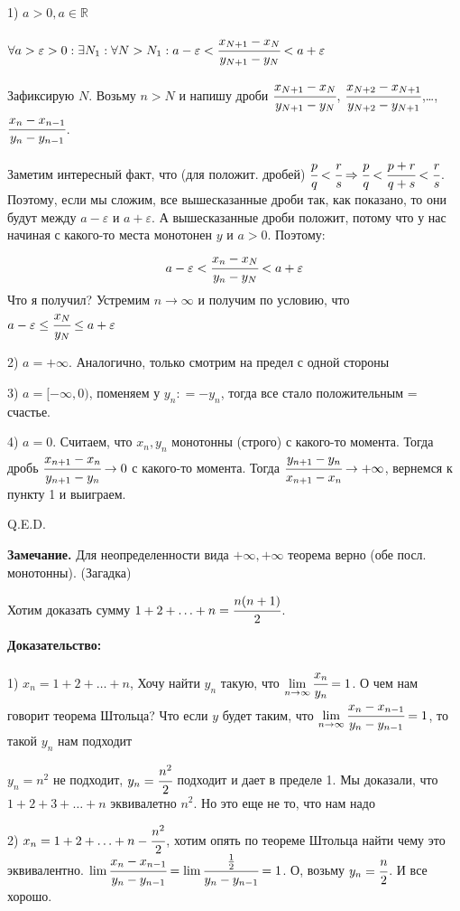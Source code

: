 1) $a>0, a \in \mathbb{R}$

$\forall a>\varepsilon>0:\exists N_1: \forall N>N_1: a-\varepsilon < \cfrac{x_{N+1}-x_N}{y_{N+1}-y_N} <a+\varepsilon$

Зафиксирую $N$. Возьму $n>N$ и напишу дроби $\cfrac{x_{N+1}-x_N}{y_{N+1}-y_N}$, $\cfrac{x_{N+2}-x_{N+1}}{y_{N+2}-y_{N+1}}$,\ldots, $\cfrac{x_{n}-x_{n-1}}{y_{n}-y_{n-1}}$.

Заметим интересный факт, что (для положит. дробей) $\cfrac{p}{q}<\cfrac{r}{s} \Rightarrow \cfrac{p}{q}<\cfrac{p+r}{q+s}<\cfrac{r}{s} $. Поэтому, если мы сложим, все вышесказанные дроби так, как показано, то они будут между $a-\varepsilon$ и $a+\varepsilon$. А вышесказанные дроби положит, потому что у нас начиная с какого-то места монотонен $y$ и $a>0$. Поэтому:
$$a-\varepsilon<\cfrac{x_n-x_N}{y_n-y_N}<a+\varepsilon$$
Что я получил? Устремим $n \rightarrow \infty$ и получим по условию, что $a-\varepsilon\leq\cfrac{x_N}{y_N}\leq a + \varepsilon$

2) $a = +\infty$. Аналогично, только смотрим на предел с одной стороны

3) $a = [-\infty, 0 )$, поменяем у $y_n: = -y_n$, тогда все стало положительным = счастье.

4) $a = 0$. Считаем, что $x_n, y_n$ монотонны (строго) с какого-то момента. Тогда дробь $\cfrac{x_{n+1}-x_n}{y_{n+1}-y_n} \rightarrow 0 $ с какого-то момента. Тогда  $\cfrac{y_{n+1}-y_n}{x_{n+1}-x_n} \rightarrow +\infty $, вернемся к пункту 1 и выиграем.

\hfill Q.E.D.

\textbf{Замечание.} Для неопределенности вида $+\infty,+\infty$ теорема верно (обе посл. монотонны). (Загадка)


Хотим доказать сумму $1 + 2 + \ldots + n = \cfrac{n(n+1)}{2}$.

\textbf{Доказательство:}

1) $x_n = 1 + 2 + \ldots + n$, Хочу найти $y_n$ такую, что
$\lim\limits_{n\rightarrow \infty} \cfrac{x_n}{y_n} = 1$. О чем нам говорит теорема Штольца? Что если $y$ будет таким, что $\lim\limits_{n\rightarrow \infty} \cfrac{x_{n}-x_{n-1}}{y_{n}-y_{n-1}} = 1$, то такой $y_n$ нам подходит

$y_n = n^2$ не подходит, $y_n = \cfrac{n^2}{2}$ подходит и дает в пределе 1. 
Мы доказали, что $1+2+3 +\ldots + n $ эквивалетно $n^2$. Но это еще не то, что нам надо

2) $x_n = 1+2+\ldots + n -\cfrac{n^2}{2}$, хотим опять по теореме Штольца найти чему это эквивалентно. $\lim \cfrac{x_n-x_{n-1}}{y_n-y_{n-1}} = \lim \cfrac{\frac{1}{2}}{y_n-y_{n-1}}=1$. О, возьму $y_n = \cfrac{n}{2}$. И все хорошо.

